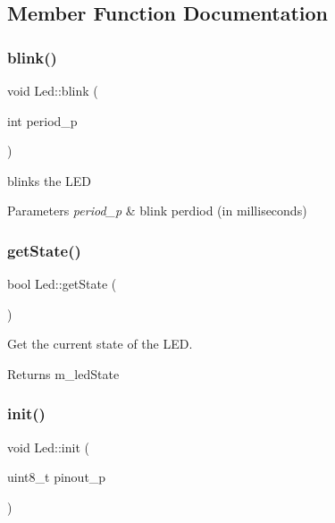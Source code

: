 \subsection{Member Function Documentation}
\mbox{\label{class_led_af71542a417a5209b4fccbf8b07ec1f24}} 
\subsubsection{\texorpdfstring{blink()}{blink()}}
{\footnotesize\ttfamily void Led\+::blink (\begin{DoxyParamCaption}\item[{int}]{period\+\_\+p }\end{DoxyParamCaption})}



blinks the L\+ED 


\begin{DoxyParams}{Parameters}
{\em period\+\_\+p} & blink perdiod (in milliseconds) \\
\hline
\end{DoxyParams}
\mbox{\label{class_led_a3c98242eb57df713fcb8d441d43ccd02}} 
\subsubsection{\texorpdfstring{get\+State()}{getState()}}
{\footnotesize\ttfamily bool Led\+::get\+State (\begin{DoxyParamCaption}{ }\end{DoxyParamCaption})}



Get the current state of the L\+ED. 

\begin{DoxyReturn}{Returns}
m\+\_\+led\+State 
\end{DoxyReturn}
\mbox{\label{class_led_a4bce8445a80436df1126471f83b0fb17}} 
\subsubsection{\texorpdfstring{init()}{init()}}
{\footnotesize\ttfamily void Led\+::init (\begin{DoxyParamCaption}\item[{uint8\+\_\+t}]{pinout\+\_\+p }\end{DoxyParamCaption})}



